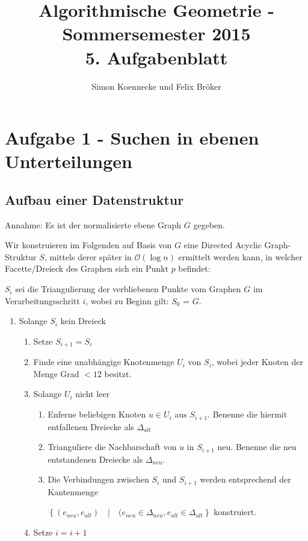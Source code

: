 \documentclass[a4paper]{article}
\begin{document}
\title{Algorithmische Geometrie - Sommersemester 2015\\
       5. Aufgabenblatt }
\author{Simon Koennecke und Felix Bröker}
\date{}
\maketitle

\section*{Aufgabe 1 - Suchen in ebenen Unterteilungen}
\subsection*{Aufbau einer Datenstruktur}
Annahme: Es ist der normalisierte ebene Graph $G$ gegeben. 

Wir konstruieren im Folgenden auf Basis von $G$ eine Directed Acyclic Graph-Struktur $S$, mittels derer 
später in $\mathcal{O}(\log n)$ ermittelt werden kann, in welcher Facette/Dreieck des Graphen
sich ein Punkt $p$ befindet:

$S_i$ sei die Triangulierung der verbliebenen Punkte vom Graphen $G$ im Verarbeitungsschritt $i$, wobei
zu Beginn gilt: $S_0$ = $G$.

\begin{enumerate}
 \item Solange $S_i$ kein Dreieck
 \begin{enumerate}
  \item Setze $S_{i+1} = S_i$
  \item Finde eine unabhängige Knotenmenge $U_i$ von $S_i$, wobei jeder Knoten der Menge Grad $< 12$ besitzt.
  \item Solange $U_i$ nicht leer
  \begin{enumerate}
   \item Enferne beliebigen Knoten $u \in U_i$ aus $S_{i+1}$. Benenne die hiermit entfallenen Dreiecke als $\Delta_{alt}$
   \item Trianguliere die Nachbarschaft von $u$ in $S_{i+1}$ neu. Benenne die neu entstandenen Dreiecke als $\Delta_{neu}$.
   \item Die Verbindungen zwischen $S_i$ und $S_{i+1}$ werden entsprechend der Kantenmenge
   
   $\left\{(e_{neu}, e_{alt}) \quad|\quad (e_{neu} \in \Delta_{neu}, e_{alt} \in \Delta_{alt} \right\}$ konstruiert.
  \end{enumerate}
  \item Setze $i = i + 1$
 \end{enumerate}

\end{enumerate}
\end{document}
